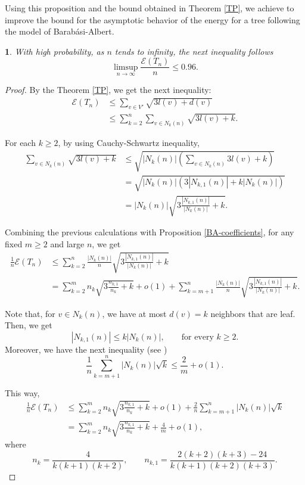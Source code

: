 \documentclass[a4paper]{article}
\newcommand{\abs}[1]{\left\lvert#1\right\rvert}
\newcommand{\energy}[1]{\mathcal{E}\left(#1\right)}
\theoremstyle{plain}
\newtheorem{theorem}{\protect\thmaname}
\renewcommand{\thmaname}{Theorem}%
\renewcommand{\thmaname}{Teorema}%
\begin{document}
Using this proposition and the bound obtained in Theorem \ref{TP}, we achieve to improve the bound for the asymptotic behavior of the energy for a tree following the model of Barab\'asi-Albert.

\begin{theorem}\label{Asym_BA}
With high probability, as $n$ tends to infinity, the next inequality follows
$$\limsup_{n\to\infty} \frac{\energy{T_n}}{n} \leq 0.96.$$

\end{theorem}

\begin{proof}
By the Theorem \ref{TP}, we get the next inequality:
\begin{align*}
    \energy{T_n} &\leq \sum_{v \in V'} \sqrt{3l(v) + d(v)}\\
    &\leq \sum_{k = 2}^n \sum_{v \in N_k(n)} \sqrt{3l(v) + k}.
\end{align*}

For each \(k \geq 2\), by using Cauchy-Schwartz inequality,
\begin{align*}
    \sum_{v \in N_k(n)} \sqrt{3l(v) + k} &\leq \sqrt{\abs{N_k(n)}\left(\sum_{v \in N_k(n)} 3l(v) + k\right)}\\
    &= \sqrt{\abs{N_k(n)}\left(3\abs{N_{k,1}(n)} + k\abs{N_k(n)}\right)}\\
    &= \abs{N_k(n)}\sqrt{3\frac{\abs{N_{k,1}(n)}}{\abs{N_k(n)}} + k}.
\end{align*}

Combining the previous calculations with Proposition \ref{BA-coefficients}, for any fixed \(m \geq 2\) and large \(n\), we get
\begin{align*}
    \frac{1}{n}\energy{T_n} &\leq \sum_{k = 2}^{n} \frac{\abs{N_k(n)}}{n} \sqrt{3\frac{\abs{N_{k,1}(n)}}{\abs{N_k(n)}} + k}\\
    &= \sum_{k = 2}^{m} n_k \sqrt{3\frac{n_{k,1}}{n_k} + k} + o(1) + \sum_{k = m+1}^n \frac{\abs{N_k(n)}}{n} \sqrt{3\frac{\abs{N_{k,1}(n)}}{\abs{N_k(n)}} + k}.
\end{align*}

Note that, for \(v \in N_k(n)\), we have at most \(d(v) = k\) neighbors that are leaf. Then, we get
\[
    \abs{N_{k,1}(n)} \leq k\abs{N_k(n)}, \qquad\mbox{for every } k \geq 2.
\]
Moreover, we have the next inequality (see \cite{Arizmendi22})
\[
    \frac{1}{n}\sum_{k = m+1}^n \abs{N_k(n)}\sqrt{k} \leq \frac{2}{m} + o(1).
\]

This way,
\begin{align*}
    \frac{1}{n}\energy{T_n} &\leq \sum_{k = 2}^{m} n_k \sqrt{3\frac{n_{k,1}}{n_k} + k} + o(1) + \frac{2}{n}\sum_{k = m+1}^n \abs{N_k(n)}\sqrt{k}\\
    &= \sum_{k = 2}^m n_k \sqrt{3\frac{n_{k,1}}{n_k} + k} + \frac{4}{m} + o(1),
\end{align*}
where
\[
    n_k = \frac{4}{k(k+1)(k+2)}, \qquad n_{k,1} = \frac{2(k+2)(k+3)-24}{k(k+1)(k+2)(k+3)}.
\]


\end{proof}
\end{document}
